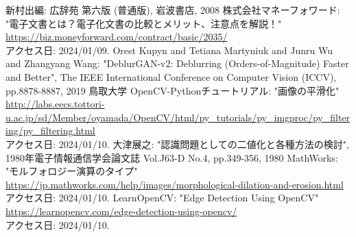 \documentclass[uplatex, report, a4j, 10pt]{jsbook}
\begin{document}

%


%
\begin{thebibliography}{0}
  新村出編: 広辞苑 第六版 (普通版), 岩波書店, 2008
  株式会社マネーフォワード: "電子文書とは？電子化文書の比較とメリット、注意点を解説！"\\\url{https://biz.moneyforward.com/contract/basic/2035/}\\アクセス日: 2024/01/09.
  Orest Kupyn and Tetiana Martyniuk and Junru Wu and Zhangyang Wang: "DeblurGAN-v2: Deblurring (Orders-of-Magnitude) Faster and Better", The IEEE International Conference on Computer Vision (ICCV), pp.8878-8887, 2019
  鳥取大学 OpenCV-Pythonチュートリアル: "画像の平滑化"\\\url{http://labs.eecs.tottori-u.ac.jp/sd/Member/oyamada/OpenCV/html/py_tutorials/py_imgproc/py_filtering/py_filtering.html}\\アクセス日: 2024/01/10.
  大津展之: "認識問題としての二値化と各種方法の検討", 1980年電子情報通信学会論文誌 Vol.J63-D No.4, pp.349-356, 1980
  MathWorks: "モルフォロジー演算のタイプ"\\\url{https://jp.mathworks.com/help/images/morphological-dilation-and-erosion.html}\\アクセス日: 2024/01/10.
  LearnOpenCV: "Edge Detection Using OpenCV"\\\url{https://learnopencv.com/edge-detection-using-opencv/}\\アクセス日: 2024/01/10.
\end{thebibliography}

\end{document}

